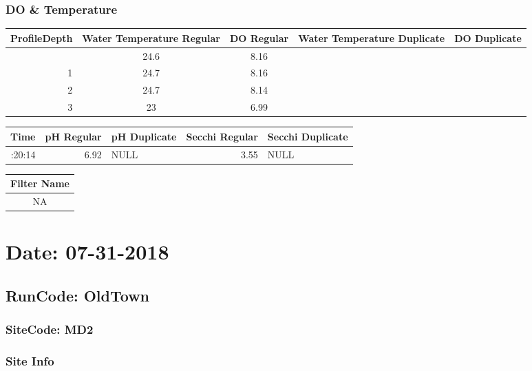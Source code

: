 \documentclass[
  letterpaper,
  DIV=11,
  numbers=noendperiod]{scrartcl}
\begin{document}
\subsubsection{DO \& Temperature}

\begin{longtable*}{rcccc}
\toprule
ProfileDepth & Water Temperature Regular & DO Regular & Water Temperature Duplicate & DO Duplicate \\ 
\midrule{} & 24.6 & 8.16 &  &  \\ 
1 & 24.7 & 8.16 &  &  \\ 
2 & 24.7 & 8.14 &  &  \\ 
3 & 23 & 6.99 &  &  \\ 
\bottomrule
\end{longtable*}

\begin{longtable*}{rrlrl}
\toprule
Time & pH Regular & pH Duplicate & Secchi Regular & Secchi Duplicate \\ 
\midrule{}:20:14 & 6.92 & NULL & 3.55 & NULL \\ 
\bottomrule
\end{longtable*}

\begin{longtable*}{c}
\toprule
Filter Name \\ 
\midrule\addlinespace[2.5pt]
NA \\ 
\bottomrule
\end{longtable*}

\hypertarget{date-07-31-2018}{%
\section{Date: 07-31-2018}\label{date-07-31-2018}}

\hypertarget{runcode-oldtown}{%
\subsection{RunCode: OldTown}\label{runcode-oldtown}}

\hypertarget{sitecode-md2}{%
\subsubsection{SiteCode: MD2}\label{sitecode-md2}}

\subsubsection{Site Info}
\end{document}
